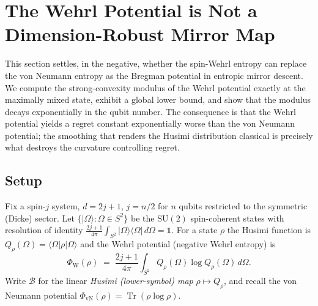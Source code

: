 %

\providecommand{\Tr}{\operatorname{Tr}}
\providecommand{\E}{\mathbb{E}}
\providecommand{\Reg}{\mathrm{Regret}}
\providecommand{\Id}{\mathbb{1}}
\providecommand{\sphere}{S^{2}}
\providecommand{\Hess}{\nabla^{2}}
\providecommand{\tnorm}[1]{\lVert #1\rVert_{1}}
\providecommand{\Berezin}{\mathcal{B}}

\section{The Wehrl Potential is Not a Dimension-Robust Mirror Map}
\label{sec:wehrl-modulus}

This section settles, in the negative, whether the spin-Wehrl entropy can
replace the von Neumann entropy as the Bregman potential in entropic mirror
descent. We compute the strong-convexity modulus of the Wehrl potential
exactly at the maximally mixed state, exhibit a global lower bound, and show
that the modulus decays exponentially in the qubit number. The consequence is
that the Wehrl potential yields a regret constant exponentially worse than the
von Neumann potential; the smoothing that renders the Husimi distribution
classical is precisely what destroys the curvature controlling regret.

\subsection{Setup}

Fix a spin-$j$ system, $d=2j+1$, $j=n/2$ for $n$ qubits restricted to the
symmetric (Dicke) sector. Let $\{\lvert\Omega\rangle:\Omega\in\sphere\}$ be the
$\mathrm{SU}(2)$ spin-coherent states with resolution of identity
$\frac{2j+1}{4\pi}\int_{\sphere}\lvert\Omega\rangle\langle\Omega\rvert\,d\Omega=\Id$.
For a state $\rho$ the Husimi function is $Q_\rho(\Omega)=\langle\Omega\rvert\rho\lvert\Omega\rangle$
and the Wehrl potential (negative Wehrl entropy) is
\begin{equation}
  \Phi_{\mathrm W}(\rho)
  \;=\;\frac{2j+1}{4\pi}\int_{\sphere}Q_\rho(\Omega)\log Q_\rho(\Omega)\,d\Omega .
  \label{eq:wehrl-potential}
\end{equation}
Write $\Berezin$ for the linear \emph{Husimi (lower-symbol) map}
$\rho\mapsto Q_\rho$, and recall the von Neumann potential
$\Phi_{\mathrm{vN}}(\rho)=\Tr(\rho\log\rho)$.


